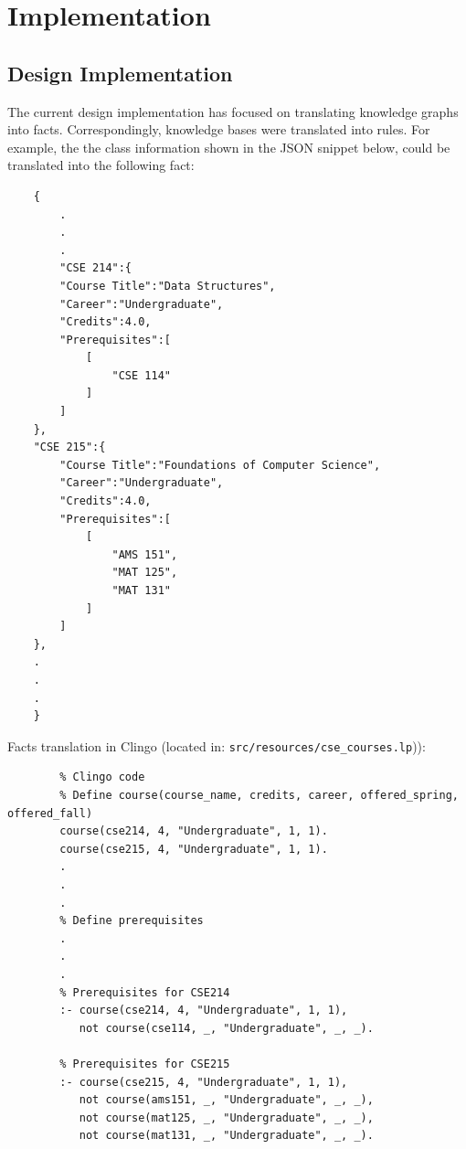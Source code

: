 \documentclass[12pt]{article}
\begin{document}
    \section{Implementation}
    \label{sec:implement}

    \subsection{Design Implementation}
    \label{subsec:des-imp}

    The current design implementation has focused on translating knowledge graphs into facts. Correspondingly, knowledge bases were translated into rules. For example, the the class information shown in the JSON snippet below,  could be translated into the following fact:

    \begin{lstlisting}
    {
        .
        .
        .
        "CSE 214":{
        "Course Title":"Data Structures",
        "Career":"Undergraduate",
        "Credits":4.0,
        "Prerequisites":[
            [
                "CSE 114"
            ]
        ]
    },
    "CSE 215":{
        "Course Title":"Foundations of Computer Science",
        "Career":"Undergraduate",
        "Credits":4.0,
        "Prerequisites":[
            [
                "AMS 151",
                "MAT 125",
                "MAT 131"
            ]
        ]
    },
    .
    .
    .
    }
    \end{lstlisting}

    Facts translation in Clingo (located in: {\tt{src/resources/cse\_courses.lp}})): \\
    
    \begin{lstlisting}
        % Clingo code
        % Define course(course_name, credits, career, offered_spring, offered_fall)
        course(cse214, 4, "Undergraduate", 1, 1).
        course(cse215, 4, "Undergraduate", 1, 1).
        .
        .
        .
        % Define prerequisites
        .
        .
        .
        % Prerequisites for CSE214
        :- course(cse214, 4, "Undergraduate", 1, 1), 
           not course(cse114, _, "Undergraduate", _, _). 
        
        % Prerequisites for CSE215
        :- course(cse215, 4, "Undergraduate", 1, 1), 
           not course(ams151, _, "Undergraduate", _, _), 
           not course(mat125, _, "Undergraduate", _, _), 
           not course(mat131, _, "Undergraduate", _, _). 
    \end{lstlisting}
\end{document}
